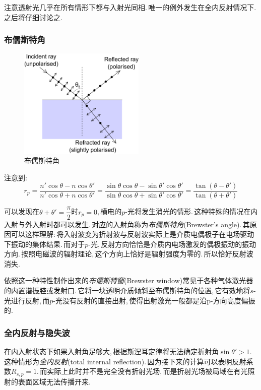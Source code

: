 注意透射光几乎在所有情形下都与入射光同相.\,唯一的例外发生在全内反射情况下.\,之后将仔细讨论之.

\subsubsection{\hei 布儒斯特角}

\begin{figure}
\centering
\vspace{-2cm}
\includegraphics[width=6cm]{image/5-6-6.png}
\caption{布儒斯特角}
\end{figure}
注意到:
\[r_p=\frac{n'\cos\theta-n\cos\theta'}{n'\cos\theta+n\cos\theta'}=\frac{\sin\theta\cos\theta-\sin\theta'\cos\theta'}{\sin\theta\cos\theta+\sin\theta'\cos\theta'}=\frac{\tan(\theta-\theta')}{\tan(\theta+\theta')}\]

可以发现在\(\theta+\theta'=\dfrac{\pi}{2}\)时\(r_p=0\),\,横电的$p$-光将发生消光的情形.\,这种特殊的情况在内入射与外入射时都可以发生.\,对应的入射角称为\emph{布儒斯特角}(Brewster's angle).\,其原因可以这样理解:\,将入射波变为折射波与反射波实际上是介质电偶极子在电场驱动下振动的集体结果.\,而对于$p$-光,\,反射方向恰恰是介质内电场激发的偶极振动的振动方向.\,按照电磁波的辐射理论,\,这个方向上恰好是辐射强度为零的.\,所以恰好反射波消失.

依照这一种特性制作出来的\emph{布儒斯特窗}(Brewster window)常见于各种气体激光器的内置谐振腔或发射口.\,它将一块透明介质倾斜至布儒斯特角的位置,\,它有效地将$s$-光进行反射,\,而$p$-光没有反射的直接出射,\,使得出射激光一般都是沿p-方向高度偏振的.

\subsubsection{\hei 全内反射与隐失波}

在内入射状态下如果入射角足够大,\,根据斯涅耳定律将无法确定折射角\(\sin\theta'>1\).\,这种情形为\emph{全内反射}(total internal reflection).\,因为接下来的计算可以表明反射系数\(R_{s,p}=1\).\,而实际上此时并不是完全没有折射光场,\,而是折射光场被局域在有光照射的表面区域无法传播开来.


